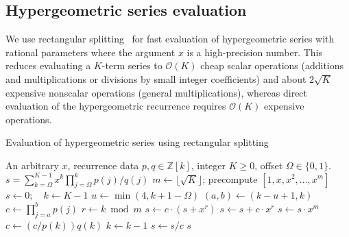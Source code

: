 \documentclass{siamart0216}
\newcommand{\OO}{\mathcal{O}}
\begin{document}
\subsection{Hypergeometric series evaluation}

\label{sec:serieseval}

We use rectangular splitting~\cite{Smith1989,Johansson2014rectangular}
for fast evaluation of hypergeometric series with
rational parameters where the argument $x$ is a high-precision number.
This reduces evaluating a $K$-term series to
$\OO(K)$ cheap scalar operations (additions and multiplications or divisions
by small integer coefficients)
and about $2\sqrt{K}$ expensive nonscalar operations (general multiplications),
whereas direct evaluation of the hypergeometric
recurrence requires $\OO(K)$ expensive operations.

\begin{algorithm}[h!]
  \caption{Evaluation of hypergeometric series using rectangular splitting}
  \small
  \label{alg:hyprs}
  \begin{algorithmic}[1]
    \Require An arbitrary $x$, recurrence data $p, q \in \mathbb{Z}[k]$, integer $K \ge 0$, offset $\Omega \in \{0,1\}$.
    \Ensure $s = \sum_{k=\Omega}^{K-1} x^k \prod_{j=\Omega}^k p(j) / q(j)$
    \State $m \gets \lfloor \sqrt K \rfloor$; precompute $[1, x, x^2, \ldots, x^m]$ 
    \State $s \gets 0; \quad k \gets K - 1$
        \State $u \gets \min(4, k + 1 - \Omega)$  
        \State $(a, b) \gets (k - u + 1, k)$  
        \State $c \gets \prod_{j=a}^b p(j)$ 
            \State $r \gets k \bmod m$
                \State $s \gets c \cdot (s + x^r)$ 
            \Else
                \State $s \gets s + c \cdot x^r$ 
            \EndIf
                \State $s \gets s \cdot x^m$ 
            \EndIf
            \State $c \gets (c / p(k)) q(k)$ 
            \State $k \gets k - 1$
        \EndWhile
        \State $s \gets s / c$
    \EndWhile
    \State \Return $s$
  \end{algorithmic}
\end{algorithm}
\end{document}
